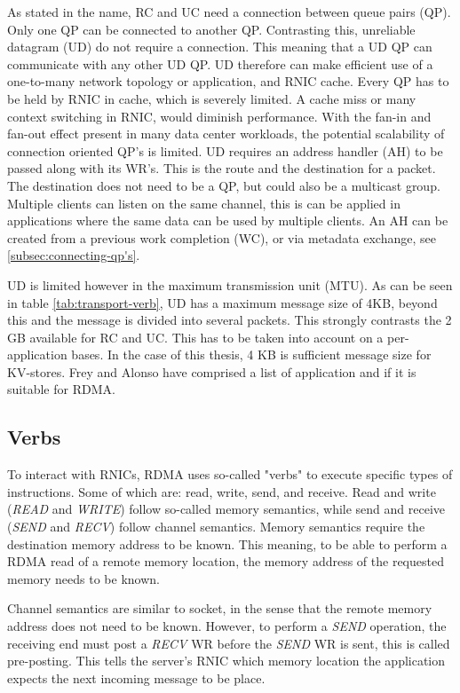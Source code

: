 As stated in the name, RC and UC need a connection between queue pairs (QP).
Only one QP can be connected to another QP.
Contrasting this, unreliable datagram (UD) do not require a connection.
This meaning that a UD QP can communicate with any other UD QP.
UD therefore can make efficient use of a one-to-many network topology or application, and RNIC cache.
Every QP has to be held by RNIC in cache, which is severely limited\cite{qiu2018toward}.
A cache miss or many context switching in RNIC, would diminish performance.
With the fan-in and fan-out effect present in many data center workloads\cite{vasudevan2009safe}, the potential scalability of connection oriented QP's is limited\cite{kalia2016fasst}.
UD requires an address handler (AH) to be passed along with its WR's.
This is the route and the destination for a packet.
The destination does not need to be a QP, but could also be a multicast group.
Multiple clients can listen on the same channel, this is can be applied in applications where the same data can be used by multiple clients.
An AH can be created from a previous work completion (WC), or via metadata exchange, see \ref{subsec:connecting-qp's}.

UD is limited however in the maximum transmission unit (MTU).
As can be seen in table \ref{tab:transport-verb}, UD has a maximum message size of 4KB, beyond this and the message is divided into several packets.
This strongly contrasts the 2 GB available for RC and UC.
This has to be taken into account on a per-application bases.
In the case of this thesis, 4 KB is sufficient message size for KV-stores.
Frey and Alonso have comprised a list of application and if it is suitable for RDMA\cite{frey2009minimizing}.

\subsection{Verbs}\label{subsec:verbs}
To interact with RNICs, RDMA uses so-called "verbs" to execute specific types of instructions.
Some of which are: read, write, send, and receive.
Read and write (\textit{READ} and \textit{WRITE}) follow so-called memory semantics, while send and receive (\textit{SEND} and \textit{RECV}) follow channel semantics.
Memory semantics require the destination memory address to be known.
This meaning, to be able to perform a RDMA read of a remote memory location, the memory address of the requested memory needs to be known.

Channel semantics are similar to socket, in the sense that the remote memory address does not need to be known.
However, to perform a \textit{SEND} operation, the receiving end must post a \textit{RECV} WR before the \textit{SEND} WR is sent, this is called pre-posting.
This tells the server's RNIC which memory location the application expects the next incoming message to be place.

